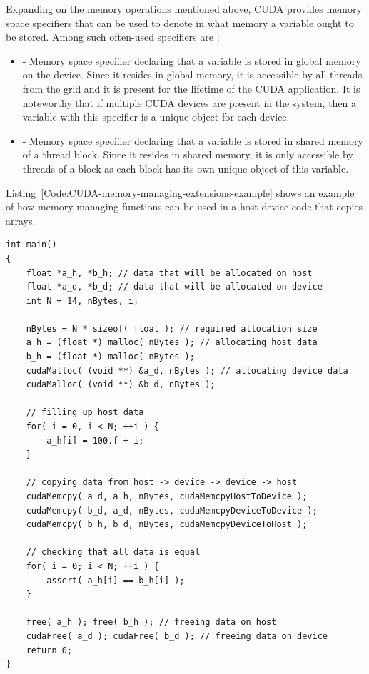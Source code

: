 Expanding on the memory operations mentioned above, CUDA provides memory space specifiers that can be used to denote in what memory a variable ought to be stored. Among such often-used specifiers are \cite{NVIDIAMay2022}:

\begin{itemize}
	\item {} - Memory space specifier declaring that a variable is stored in global memory on the device. Since it resides in global memory, it is accessible by all threads from the grid and it is present for the lifetime of the CUDA application. It is noteworthy that if multiple CUDA devices are present in the system, then a variable with this specifier is a unique object for each device.
	\item {} - Memory space specifier declaring that a variable is stored in shared memory of a thread block. Since it resides in shared memory, it is only accessible by threads of a block as each block has its own unique object of this variable.
\end{itemize}

Listing~\ref{Code:CUDA-memory-managing-extensions-example} shows an example of how memory managing functions can be used in a host-device code that copies arrays.

\begin{lstlisting}[caption= Example of code that utilizes CUDA memory managing extensions of C++. Taken from \emph{Formats for storage of sparse matrices on GPU} \cite{Cejka2020} and Nvidia's \emph{Getting Started with CUDA} presentation \cite{Ruetsch2008}.,label=Code:CUDA-memory-managing-extensions-example]
int main()
{
	float *a_h, *b_h; // data that will be allocated on host
	float *a_d, *b_d; // data that will be allocated on device
	int N = 14, nBytes, i;
	
	nBytes = N * sizeof( float ); // required allocation size
	a_h = (float *) malloc( nBytes ); // allocating host data
	b_h = (float *) malloc( nBytes ); 
	cudaMalloc( (void **) &a_d, nBytes ); // allocating device data
	cudaMalloc( (void **) &b_d, nBytes );
	
	// filling up host data
	for( i = 0, i < N; ++i ) {
		a_h[i] = 100.f + i;
	}

	// copying data from host -> device -> device -> host
	cudaMemcpy( a_d, a_h, nBytes, cudaMemcpyHostToDevice );
	cudaMemcpy( b_d, a_d, nBytes, cudaMemcpyDeviceToDevice );
	cudaMemcpy( b_h, b_d, nBytes, cudaMemcpyDeviceToHost );
	
	// checking that all data is equal
	for( i = 0; i < N; ++i ) {
		assert( a_h[i] == b_h[i] );
	}

	free( a_h ); free( b_h ); // freeing data on host
	cudaFree( a_d ); cudaFree( b_d ); // freeing data on device
	return 0;
}
\end{lstlisting}

